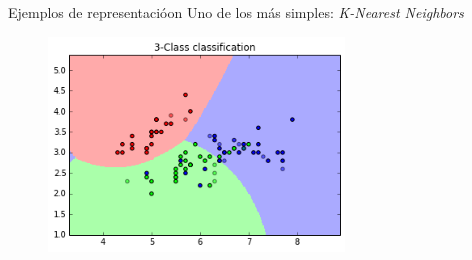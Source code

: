 \documentclass[11pt]{beamer}
\begin{document}
\begin{frame}{Ejemplos de representaci\'oon}
  Uno de los m\'as simples: \textit{K-Nearest Neighbors}
  \begin{figure}
  \centering
  \includegraphics[width=0.7\textwidth]{images/knearest_example.png}
  \label{fig:my_label}
  \end{figure}
\end{frame}
\end{document}
